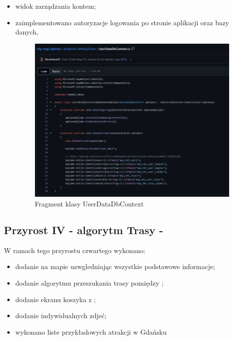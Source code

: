 \begin{itemize}
        \item widok zarządzania kontem;
        \item zaimplementowano autoryzacje logowania po stronie aplikacji oraz bazy danych,
    \begin{figure}[H]
        \centering
        \includegraphics[width=1\textwidth]{attachments/userdb}
        \caption{Fragment klasy UserDataDbContext}
        \label{fig:figure}
        \end{figure}
    \end{itemize}



    \subsection{Przyrost IV - algorytm Trasy - }
    \label{sec:przyrost4}

    W ramach tego przyrostu czwartego wykonano:
    \begin{itemize}
        \item dodanie  na mapie uzwgledniając wszystkie podstawowe informacje;
        \item dodanie algorytmu przeszukania trasy pomiędzy ;
        \item dodanie ekranu koszyka z ;
        \item dodanie indywidualnych zdjeć;
        \item wykonano liste przykładowych atrakcji w Gdańsku
    \end{itemize}


